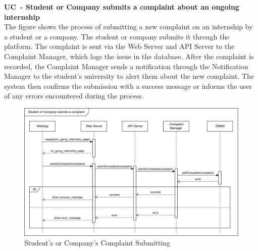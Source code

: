 \textbf{UC\cuc\  - Student or Company submits a complaint about an ongoing internship} \\
The figure shows the process of submitting a new complaint on an internship by a student or a company. The student or company submits it through the platform. The complaint is sent via the Web Server and API Server to the Complaint Manager, which logs the issue in the database. After the complaint is recorded, the Complaint Manager sends a notification through the Notification Manager to the student’s university to alert them about the new complaint. The system then confirms the submission with a success message or informs the user of any errors encountered during the process.
\begin{center}
    \begin{figure}[H]
        \centering
        \includegraphics[width=1\linewidth]{Images/Sequence diagrams/UC14.png}
        \caption{Student's or Company's Complaint Submitting}
        \label{fig:enter-label}
    \end{figure}
\end{center}

